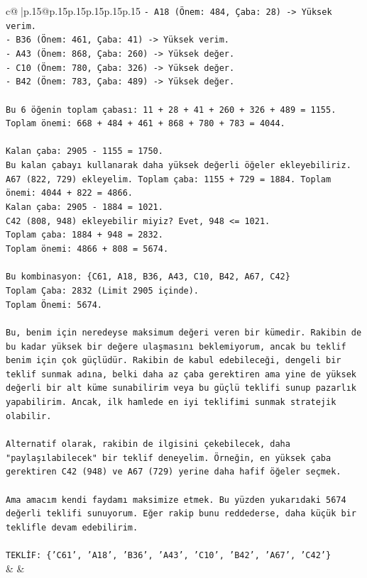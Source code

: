 \documentclass{article}
\begin{document}
{\begin{supertabular}{c@{$\;$}|p{.15\linewidth}@{}p{.15\linewidth}p{.15\linewidth}p{.15\linewidth}p{.15\linewidth}p{.15\linewidth}}
{{{\texttt{{-} A18 (Önem: 484, Çaba: 28) {-}> Yüksek verim.} \\
\texttt{{-} B36 (Önem: 461, Çaba: 41) {-}> Yüksek verim.} \\
\texttt{{-} A43 (Önem: 868, Çaba: 260) {-}> Yüksek değer.} \\
\texttt{{-} C10 (Önem: 780, Çaba: 326) {-}> Yüksek değer.} \\
\texttt{{-} B42 (Önem: 783, Çaba: 489) {-}> Yüksek değer.} \\
\\ 
\texttt{Bu 6 öğenin toplam çabası: 11 + 28 + 41 + 260 + 326 + 489 = 1155.} \\
\texttt{Toplam önemi: 668 + 484 + 461 + 868 + 780 + 783 = 4044.} \\
\\ 
\texttt{Kalan çaba: 2905 {-} 1155 = 1750.} \\
\texttt{Bu kalan çabayı kullanarak daha yüksek değerli öğeler ekleyebiliriz.} \\
\texttt{A67 (822, 729) ekleyelim. Toplam çaba: 1155 + 729 = 1884. Toplam önemi: 4044 + 822 = 4866.} \\
\texttt{Kalan çaba: 2905 {-} 1884 = 1021.} \\
\texttt{C42 (808, 948) ekleyebilir miyiz? Evet, 948 <= 1021.} \\
\texttt{Toplam çaba: 1884 + 948 = 2832.} \\
\texttt{Toplam önemi: 4866 + 808 = 5674.} \\
\\ 
\texttt{Bu kombinasyon: \{C61, A18, B36, A43, C10, B42, A67, C42\}} \\
\texttt{Toplam Çaba: 2832 (Limit 2905 içinde).} \\
\texttt{Toplam Önemi: 5674.} \\
\\ 
\texttt{Bu, benim için neredeyse maksimum değeri veren bir kümedir. Rakibin de bu kadar yüksek bir değere ulaşmasını beklemiyorum, ancak bu teklif benim için çok güçlüdür. Rakibin de kabul edebileceği, dengeli bir teklif sunmak adına, belki daha az çaba gerektiren ama yine de yüksek değerli bir alt küme sunabilirim veya bu güçlü teklifi sunup pazarlık yapabilirim. Ancak, ilk hamlede en iyi teklifimi sunmak stratejik olabilir.} \\
\\ 
\texttt{Alternatif olarak, rakibin de ilgisini çekebilecek, daha "paylaşılabilecek" bir teklif deneyelim. Örneğin, en yüksek çaba gerektiren C42 (948) ve A67 (729) yerine daha hafif öğeler seçmek.} \\
\\ 
\texttt{Ama amacım kendi faydamı maksimize etmek. Bu yüzden yukarıdaki 5674 değerli teklifi sunuyorum. Eğer rakip bunu reddederse, daha küçük bir teklifle devam edebilirim.} \\
\\ 
\texttt{TEKLİF: \{'C61', 'A18', 'B36', 'A43', 'C10', 'B42', 'A67', 'C42'\}} \\
            }
        }
    }
    & & \\ \\


\end{supertabular}}
\end{document}
